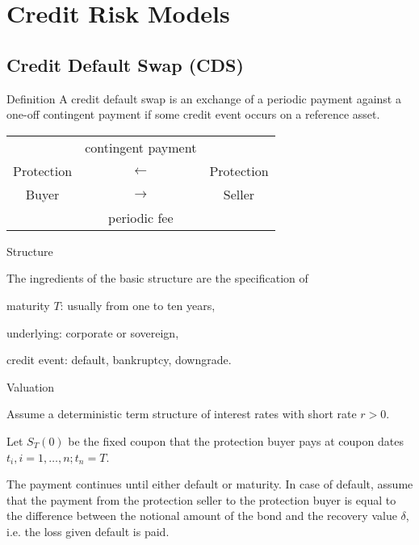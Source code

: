 


\section{Credit Risk Models}
\subsection{Credit Default Swap (CDS)}

{Definition}
A credit default swap is an exchange of a periodic payment against
a one-off contingent payment if some credit event occurs on a
reference asset.

\begin{table}[htb]
\begin{center}
\begin{tabular}{ccc}
& {\small contingent payment} & \\
Protection& $\longleftarrow $ & Protection\\
Buyer & $\longrightarrow $& Seller\\
& {\small periodic fee} &
\end{tabular}
\end{center}
\end{table}

{Structure}

The ingredients of the basic structure are the specification of






	maturity $T$: usually from one to ten years,

underlying: corporate or sovereign,

	 credit event:
default, bankruptcy, downgrade.






{Valuation}






	Assume a deterministic term structure of interest rates with short rate $r>0$.

	Let $S_T(0)$ be the fixed coupon that the protection buyer pays at coupon dates
$t_i, i=1,\ldots, n; t_n=T$.

	The
payment continues until either default or maturity. In case of
default, assume that the payment from the protection seller to the
protection buyer is equal to the difference between the notional
amount of the bond and the recovery value $\delta$, i.e. the loss given default is paid.

